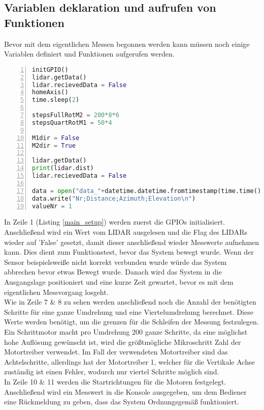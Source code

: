 \subsection{Variablen deklaration und aufrufen von Funktionen}
Bevor mit dem eigentlichen Messen begonnen werden kann müssen noch einige Variablen definiert und Funktionen aufgerufen werden.
\begin{lstlisting}[caption={Aufrufen von Funktionen und Variablen deklaration}, language={Python}, label={main_setup}, numbers=left]
initGPIO()
lidar.getData()
lidar.recievedData = False
homeAxis()
time.sleep(2)

stepsFullRotM2 = 200*8*6
stepsQuartRotM1 = 50*4

M1dir = False
M2dir = True

lidar.getData()
print(lidar.dist)
lidar.recievedData = False

data = open("data_"+datetime.datetime.fromtimestamp(time.time()).strftime('%Y-%m-%d_%H-%M-%S')+".csv", "w")
data.write("Nr;Distance;Azimuth;Elevation\n")
valueNr = 1
\end{lstlisting}
In Zeile 1 (Listing \ref{main_setup}) werden zuerst die \acp{GPIO} initialisiert. Anschließend wird ein Wert vom \ac{LIDAR} ausgelesen  und die Flag des \acp{LIDAR} wieder auf 'False' gesetzt, damit dieser anschließend wieder Messwerte aufnehmen kann. Dies dient zum Funktionstest, bevor das System bewegt wurde. Wenn der Sensor beispielsweiße nicht korrekt verbunden wurde würde das System abbrechen bevor etwas Bewegt wurde. Danach wird das System in die Ausgangslage positioniert und eine kurze Zeit gewartet, bevor es mit dem eigentlichen Messvorgang losgeht.\\
Wie in Zeile 7 \& 8 zu sehen werden anschließend noch die Anzahl der benötigten Schritte für eine ganze Umdrehung und eine Viertelumdrehung berechnet. Diese Werte werden benötigt, um die grenzen für die Schleifen der Messung festzulegen. Ein Schrittmotor macht pro Umdrehung 200 ganze Schritte, da eine möglichst hohe Auflösung gewünscht ist, wird die größtmögliche Mikroschritt Zahl der Motortreiber verwendet. Im Fall der verwendeten Motortreiber sind das Achtelschritte, allerdings hat der Motortreiber 1, welcher für die Vertikale Achse zuständig ist einen Fehler, wodurch nur viertel Schritte möglich sind.\\
In Zeile 10 \& 11 werden die Startrichtungen für die Motoren festgelegt.\\
Anschließend wird ein Messwert in die Konsole ausgegeben, um dem Bediener eine Rückmeldung zu geben, dass das System Ordnungsgemäß funktioniert.\\
